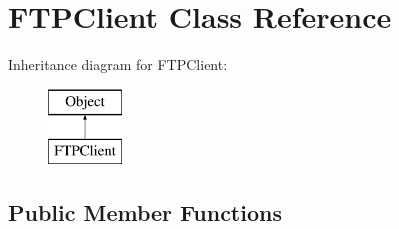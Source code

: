 \hypertarget{class_f_t_p_client}{
\section{FTPClient Class Reference}
\label{class_f_t_p_client}
}
Inheritance diagram for FTPClient:\begin{figure}[H]
\begin{center}
\leavevmode
\includegraphics[height=2.000000cm]{class_f_t_p_client}
\end{center}
\end{figure}
\subsection*{Public Member Functions}
